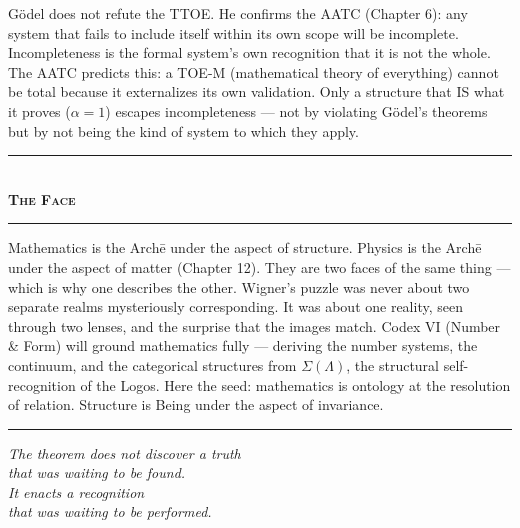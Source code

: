 \documentclass[10pt, openany, oneside]{book}
\renewcommand{\normalsize}{\fontsize{10}{13}\selectfont}
\begin{document}
G\"{o}del does not refute the TTOE. He confirms the AATC (Chapter 6): any system that fails to include itself within its own scope will be incomplete. Incompleteness is the formal system's own recognition that it is not the whole. The AATC predicts this: a TOE-M (mathematical theory of everything) cannot be total because it externalizes its own validation. Only a structure that IS what it proves ($\alpha = 1$) escapes incompleteness --- not by violating G\"{o}del's theorems but by not being the kind of system to which they apply.

\vspace{1.5em}


\begin{center}
    \rule{0.3\textwidth}{0.4pt}\\[0.5em]
    {\normalsize\bfseries\scshape The Face}\\[0.3em]
    \rule{0.3\textwidth}{0.4pt}
\end{center}

\vspace{1em}

\noindent Mathematics is the Arch\={e} under the aspect of structure. Physics is the Arch\={e} under the aspect of matter (Chapter 12). They are two faces of the same thing --- which is why one describes the other. Wigner's puzzle was never about two separate realms mysteriously corresponding. It was about one reality, seen through two lenses, and the surprise that the images match. Codex VI (Number \& Form) will ground mathematics fully --- deriving the number systems, the continuum, and the categorical structures from $\Sigma(\Lambda)$, the structural self-recognition of the Logos. Here the seed: mathematics is ontology at the resolution of relation. Structure is Being under the aspect of invariance.

\vspace{2em}

\begin{center}
    \rule{0.15\textwidth}{0.3pt}
\end{center}

\vspace{0.5em}

\begin{center}
    \itshape
    The theorem does not discover a truth\\
    that was waiting to be found.\\[0.8em]
    It enacts a recognition\\
    that was waiting to be performed.
\end{center}
\end{document}
